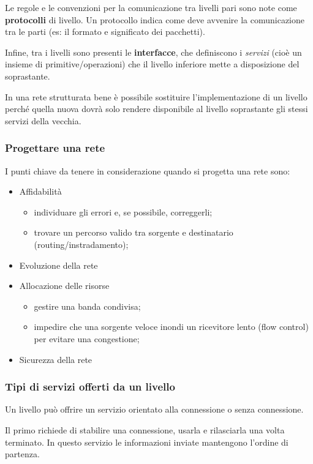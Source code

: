 Le regole e le convenzioni per la comunicazione tra livelli pari sono note come \textbf{protocolli} di livello.
Un protocollo indica come deve avvenire la comunicazione tra le parti (es: il formato e significato dei pacchetti).

Infine, tra i livelli sono presenti le \textbf{interfacce}, che definiscono i \textit{servizi} (cioè un insieme di primitive/operazioni) che il livello inferiore mette a disposizione del soprastante.

In una rete strutturata bene è possibile sostituire l'implementazione di un livello perché quella nuova dovrà solo rendere disponibile al livello soprastante gli stessi servizi della vecchia.

\subsubsection{Progettare una rete}

I punti chiave da tenere in considerazione quando si progetta una rete sono:
\begin{itemize}
\item Affidabilità
\begin{itemize}
\item individuare gli errori e, se possibile, correggerli;
\item trovare un percorso valido tra sorgente e destinatario (routing/instradamento);
\end{itemize}
\item Evoluzione della rete
\item Allocazione delle risorse
\begin{itemize}
\item gestire una banda condivisa;
\item impedire che una sorgente veloce inondi un ricevitore lento (flow control) per evitare una congestione;
\end{itemize}
\item Sicurezza della rete
\end{itemize}

\subsubsection{Tipi di servizi offerti da un livello}
Un livello può offrire un servizio orientato alla connessione o senza connessione.

Il primo richiede di stabilire una connessione, usarla e rilasciarla una volta terminato. 
In questo servizio le informazioni inviate mantengono l'ordine di partenza.

